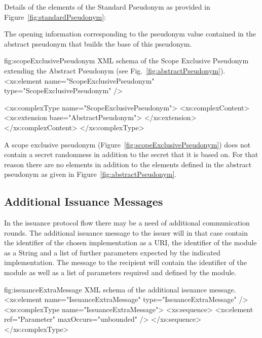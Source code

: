 \vspace{3pt}\noindent Details of the elements of the Standard Pseudonym as provided in Figure~\ref{fig:standardPseudonym}:
\begin{parameter}
The opening information corresponding to the pseudonym value contained in the abstract pseudonym that builds the base 
of this pseudonym.
\end{parameter}



\begin{xml}
{fig:scopeExclusivePseudonym}
{XML schema of the Scope Exclusive Pseudonym extending the Abstract Pseudonym (see Fig.~\ref{fig:abstractPseudonym}).}
<xs:element name="ScopeExclusivePseudonym" type="ScopeExclusivePseudonym" />

<xs:complexType name="ScopeExclusivePseudonym">
  <xs:complexContent>
    <xs:extension base="AbstractPseudonym">
    </xs:extension>
  </xs:complexContent>
</xs:complexType>
\end{xml}

\vspace{3pt}\noindent A scope exclusive pseudonym (Figure~\ref{fig:scopeExclusivePseudonym}) does not contain a secret 
randomness in addition to the secret that it is based on. 
For that reason there are no elements in addition to the elements defined in the abstract pseudonym as given in 
Figure~\ref{fig:abstractPseudonym}.





\subsection{Additional Issuance Messages}
 
In the issuance protocol flow there may be a need of additional communication rounds. 
The additional issuance message to the issuer will in that case contain the identifier of the chosen implementation as a URI, 
the identifier of the module as a String and a list of further parameters expected by the indicated implementation.
The message to the recipient will contain the identifier of the module as well as a list of parameters required and defined 
by the module.


\begin{xml}
{fig:issuanceExtraMessage}
{XML schema of the additional issuance message.}
<xs:element name="IssuanceExtraMessage" type="IssuanceExtraMessage" />
<xs:complexType name="IssuanceExtraMessage">
  <xs:sequence>
    <xs:element ref="Parameter" maxOccurs="unbounded" />
  </xs:sequence>
</xs:complexType>
\end{xml}

